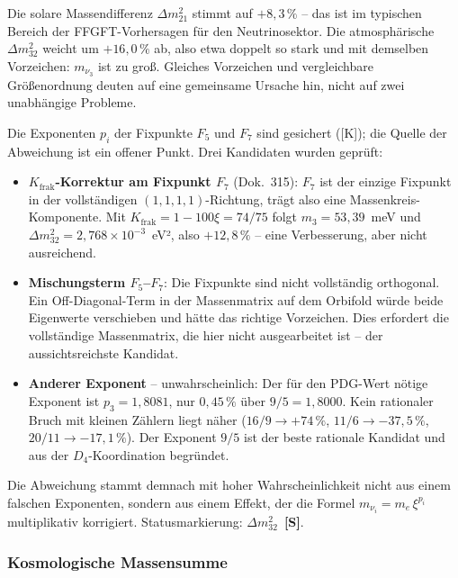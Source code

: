 \begin{tcolorbox}[colback=yellow!5!white, colframe=yellow!60!black,
  title={Offener Punkt: atmosphärische Massendifferenz}]
Die solare Massendifferenz $\Delta m_{21}^2$ stimmt auf $+8{,}3\,\%$ --
das ist im typischen Bereich der FFGFT-Vorhersagen für den Neutrinosektor.
Die atmosphärische $\Delta m_{32}^2$ weicht um $+16{,}0\,\%$ ab, also
etwa doppelt so stark und mit demselben Vorzeichen: $m_{\nu_3}$ ist zu
groß. Gleiches Vorzeichen und vergleichbare Größenordnung deuten auf
eine gemeinsame Ursache hin, nicht auf zwei unabhängige Probleme.

Die Exponenten $p_i$ der Fixpunkte $F_5$ und $F_7$ sind gesichert
([K]); die Quelle der Abweichung ist ein offener Punkt.
Drei Kandidaten wurden geprüft:
\begin{itemize}
  \item \textbf{$K_{\mathrm{frak}}$-Korrektur am Fixpunkt $F_7$}
    (Dok.~315): $F_7$ ist der einzige Fixpunkt in der vollständigen
    $(1,1,1,1)$-Richtung, trägt also eine Massenkreis-Komponente. Mit
    $K_{\mathrm{frak}} = 1-100\xi = 74/75$ folgt
    $m_3 = 53{,}39$~meV und $\Delta m_{32}^2 = 2{,}768\times10^{-3}$~eV²,
    also $+12{,}8\,\%$ -- eine Verbesserung, aber nicht ausreichend.
  \item \textbf{Mischungsterm $F_5$--$F_7$}: Die Fixpunkte sind nicht
    vollständig orthogonal. Ein Off-Diagonal-Term in der Massenmatrix
    auf dem Orbifold würde beide Eigenwerte verschieben und hätte das
    richtige Vorzeichen. Dies erfordert die vollständige Massenmatrix,
    die hier nicht ausgearbeitet ist -- der aussichtsreichste Kandidat.
  \item \textbf{Anderer Exponent} -- unwahrscheinlich: Der für den
    PDG-Wert nötige Exponent ist $p_3 = 1{,}8081$, nur $0{,}45\,\%$
    über $9/5 = 1{,}8000$. Kein rationaler Bruch mit kleinen Zählern
    liegt näher ($16/9 \to +74\,\%$, $11/6 \to -37{,}5\,\%$,
    $20/11 \to -17{,}1\,\%$). Der Exponent $9/5$ ist der beste
    rationale Kandidat und aus der $D_4$-Koordination begründet.
\end{itemize}
Die Abweichung stammt demnach mit hoher Wahrscheinlichkeit nicht aus
einem falschen Exponenten, sondern aus einem Effekt, der die Formel
$m_{\nu_i} = m_e\,\xi^{p_i}$ multiplikativ korrigiert.
Statusmarkierung: $\Delta m_{32}^2$~\textbf{[S]}.
\end{tcolorbox}

\subsubsection{Kosmologische Massensumme}

